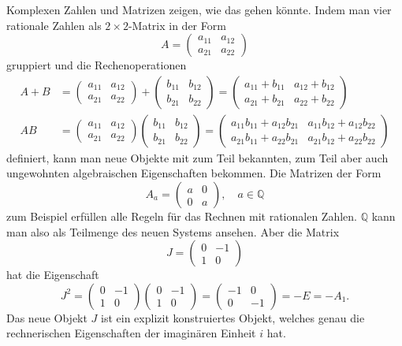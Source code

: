 Komplexen Zahlen und Matrizen zeigen, wie das gehen könnte.
Indem man vier rationale Zahlen als $2\times 2$-Matrix in der Form
\[
A=
\begin{pmatrix}
a_{11}&a_{12}\\
a_{21}&a_{22}
\end{pmatrix}
\]
gruppiert und die Rechenoperationen
\begin{align*}
A+B
&=
\begin{pmatrix}
a_{11}&a_{12}\\
a_{21}&a_{22}
\end{pmatrix}
+
\begin{pmatrix}
b_{11}&b_{12}\\
b_{21}&b_{22}
\end{pmatrix}
=
\begin{pmatrix}
a_{11}+b_{11}&a_{12}+b_{12}\\
a_{21}+b_{21}&a_{22}+b_{22}
\end{pmatrix}
\\
AB
&=
\begin{pmatrix}
a_{11}&a_{12}\\
a_{21}&a_{22}
\end{pmatrix}
\begin{pmatrix}
b_{11}&b_{12}\\
b_{21}&b_{22}
\end{pmatrix}
=
\begin{pmatrix}
a_{11}b_{11} + a_{12}b_{21} & a_{11}b_{12} + a_{12}b_{22} \\
a_{21}b_{11} + a_{22}b_{21} & a_{21}b_{12} + a_{22}b_{22}
\end{pmatrix}
\end{align*}
definiert, kann man neue Objekte mit zum Teil bekannten, zum Teil
aber auch ungewohnten algebraischen Eigenschaften bekommen.
Die Matrizen der Form
\[
A_a
=
\begin{pmatrix} a&0\\0&a \end{pmatrix},
\quad
a\in\mathbb{Q}
\]
zum Beispiel erfüllen alle Regeln für das Rechnen mit rationalen Zahlen.
$\mathbb{Q}$ kann man also als Teilmenge des neuen Systems ansehen.
Aber die Matrix
\[
J
=
\begin{pmatrix} 0&-1\\1&0 \end{pmatrix}
\]
hat die Eigenschaft
\[
J^2 = 
\begin{pmatrix} 0&-1\\1&0 \end{pmatrix}
\begin{pmatrix} 0&-1\\1&0 \end{pmatrix}
=
\begin{pmatrix} -1&0\\0&-1\end{pmatrix}
=
-E = -A_1.
\]
Das neue Objekt $J$ ist ein explizit konstruiertes Objekt, welches
genau die rechnerischen Eigenschaften der imaginären Einheit $i$ hat.

